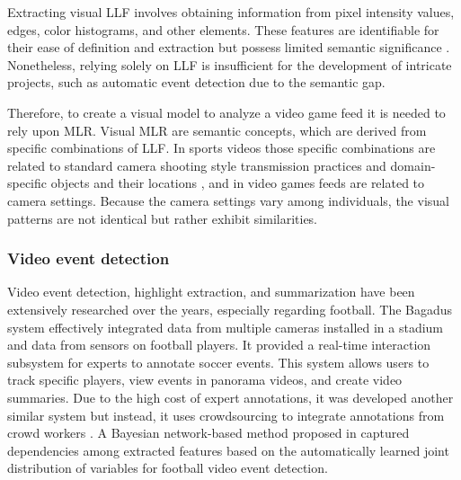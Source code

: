     Extracting visual \gls{LLF} involves obtaining information from pixel intensity values, edges, color histograms, and other elements. These features are identifiable for their ease of definition and extraction but possess limited semantic significance \cite{interaction_between_modules_in_learning_systems_for_vision_applications}. Nonetheless, relying solely on \gls{LLF} is insufficient for the development of intricate projects, such as automatic event detection due to the semantic gap.

    Therefore, to create a visual model to analyze a video game feed it is needed to rely upon \gls{MLR}. Visual \gls{MLR} are semantic concepts, which are derived from specific combinations of \gls{LLF}. In sports videos those specific combinations are related to standard camera shooting style transmission practices and domain-specific objects and their locations \cite{SOCCER_VIDEO_EVENT_DETECTION}, and in video games feeds are related to camera settings. Because the camera settings vary among individuals, the visual patterns are not identical but rather exhibit similarities.

\subsubsection*{Video event detection}

    Video event detection, highlight extraction, and summarization have been extensively researched over the years, especially regarding football. The Bagadus system \cite{RTS_soccer_analytics} effectively integrated data from multiple cameras installed in a stadium and data from sensors on football players. It provided a real-time interaction subsystem for experts to annotate soccer events. This system allows users to track specific players, view events in panorama videos, and create video summaries. Due to the high cost of expert annotations, it was developed another similar system but instead, it uses crowdsourcing to integrate annotations from crowd workers \cite{Crowd-based_Semantic_Event_Detection}. A Bayesian network-based method proposed in \cite{EventDetectionAndSummarizationInSoccerVideosUsingBayesianNetworkAndCopula} captured dependencies among extracted features based on the automatically learned joint distribution of variables for football video event detection.

